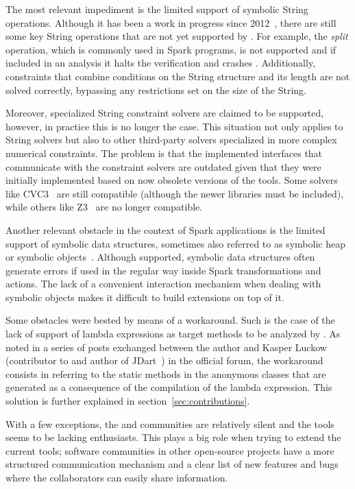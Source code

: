 The most relevant impediment is the limited support of symbolic String operations. Although it has been a work in progress since 2012~\cite{Redelinghuys2012,Pasareanu2013}, there are still some key String operations that are not yet supported by \spf{}. For example, the \textit{split} operation, which is commonly used in Spark programs, is not supported and if included in an analysis it halts the verification and crashes \jpf{}. Additionally, constraints that combine conditions on the String structure and its length are not solved correctly, bypassing any restrictions set on the size of the String.

Moreover, specialized String constraint solvers are claimed to be supported, however, in practice this is no longer the case. This situation not only applies to String solvers but also to other third-party solvers specialized in more complex numerical constraints. The problem is that the implemented interfaces that communicate with the constraint solvers are outdated given that they were initially implemented based on now obsolete versions of the tools. Some solvers like CVC3~\cite{Barrett2007} are still compatible (although the newer libraries must be included), while others like Z3~\cite{DeMoura2008} are no longer compatible.

Another relevant obstacle in the context of Spark applications is the limited support of symbolic data structures, sometimes also referred to as symbolic heap or symbolic objects~\cite{Pasareanu2010}. Although supported, symbolic data structures often generate errors if used in the regular way inside Spark transformations and actions. The lack of a convenient interaction mechanism when dealing with symbolic objects makes it difficult to build extensions on top of it.

Some obstacles were bested by means of a workaround. Such is the case of the lack of support of lambda expressions as target methods to be analyzed by \spf{}. As noted in a series of posts exchanged between the author and Kasper Luckow (contributor to \spf{} and author of JDart~\cite{Luckow2016}) in the official \jpf{} forum, the workaround consists in referring to the static methods in the anonymous classes that are generated as a consequence of the compilation of the lambda expression. This solution is further explained in section~\ref{sec:contributions}.

With a few exceptions, the \jpf{} and \spf{} communities are relatively silent and the tools seems to be lacking enthusiasts. This plays a big role when trying to extend the current tools; software communities in other open-source projects have a more structured communication mechanism and a clear list of new features and bugs where the collaborators can easily share information.

